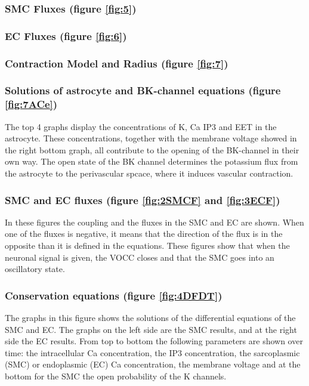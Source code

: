 	\subsubsection*{SMC Fluxes (figure \ref{fig:5})}
	
	\subsubsection*{EC Fluxes (figure \ref{fig:6})}
	
	\subsubsection*{Contraction Model and Radius (figure \ref{fig:7})}
	
	

	\subsubsection*{Solutions of astrocyte and BK-channel equations (figure \ref{fig:7ACe})}
	 The top 4 graphs display the concentrations of \gls{K}, \gls{Ca} \gls{IP3} and EET in the astrocyte. These concentrations, together with the membrane voltage showed in the right bottom graph, all contribute to the opening of the BK-channel in their own way. The open state of the BK channel determines the potassium flux from the astrocyte to the perivascular spcace, where it induces vascular contraction.
	
	\subsubsection*{SMC and EC fluxes (figure \ref{fig:2SMCF} and \ref{fig:3ECF})}
	In these figures the coupling and the fluxes in the SMC and EC are shown. When one of the fluxes is negative, it means that the direction of the flux is in the opposite than it is defined in the equations. These figures show that when the neuronal signal is given, the VOCC closes and that the SMC goes into an oscillatory state. 
	
	\subsubsection*{Conservation equations (figure \ref{fig:4DFDT})}
	The graphs in this figure shows the solutions of the differential equations of the \gls{SMC} and \gls{EC}. The graphs on the left side are the SMC results, and at the right side the EC results. From top to bottom the following parameters are shown over time: the intracellular \gls{Ca} concentration, the \gls{IP3} concentration, the sarcoplasmic (\gls{SMC}) or endoplasmic (\gls{EC}) \gls{Ca} concentration, the membrane voltage and at the bottom for the SMC the open probability of the \gls{K} channels.
	
